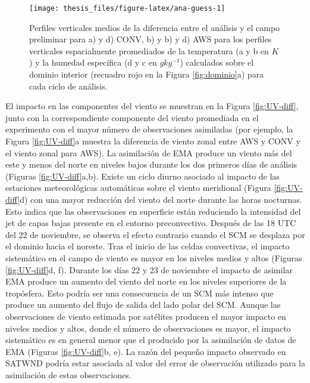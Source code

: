 \documentclass[12pt,oneside,a4paper]{reedthesis}
\begin{document}
\begin{figure}

{\centering \texttt{[image: thesis\_files/figure-latex/ana-guess-1]} 

}

\caption{Perfiles verticales medios de la diferencia entre el análisis y el campo preliminar para a) y d) CONV, b) y b) y d) AWS para los perfiles verticales espacialmente promediados de la temperatura (a y b en \(K\)) y la humedad específica (d y c en \(gkg^{-1}\)) calculados sobre el dominio interior (recuadro rojo en la Figura \ref{fig:dominio}a) para cada ciclo de análisis.}\label{fig:ana-guess}
\end{figure}
El impacto en las componentes del viento se muestran en la Figura \ref{fig:UV-diff}, junto con la correspondiente componente del viento promediada en el experimento con el mayor número de observaciones asimiladas (por ejemplo, la Figura \ref{fig:UV-diff}a muestra la diferencia de viento zonal entre AWS y CONV y el viento zonal para AWS). La asimilación de EMA produce un viento más del este y menos del norte en niveles bajos durante los dos primeros días de análisis (Figuras \ref{fig:UV-diff}a,b). Existe un ciclo diurno asociado al impacto de las estaciones meteorológicas automáticas sobre el viento meridional (Figura \ref{fig:UV-diff}d) con una mayor reducción del viento del norte durante las horas nocturnas. Esto indica que las observaciones en superficie están reduciendo la intensidad del jet de capas bajas presente en el entorno preconvectivo. Después de las 18 UTC del 22 de noviembre, se observa el efecto contrario cuando el SCM se desplaza por el dominio hacia el noreste. Tras el inicio de las celdas convectivas, el impacto sistemático en el campo de viento es mayor en los niveles medios y altos (Figuras \ref{fig:UV-diff}d, f). Durante los días 22 y 23 de noviembre el impacto de asimilar EMA produce un aumento del viento del norte en los niveles superiores de la tropósfera. Esto podría ser una consecuencia de un SCM más intenso que produce un aumento del flujo de salida del lado polar del SCM. Aunque las observaciones de viento estimada por satélites producen el mayor impacto en niveles medios y altos, donde el número de observaciones es mayor, el impacto sistemático es en general menor que el producido por la asimilación de datos de EMA (Figuras \ref{fig:UV-diff}b, e). La razón del pequeño impacto observado en SATWND podría estar asociada al valor del error de observación utilizado para la asimilación de estas observaciones.
\end{document}
